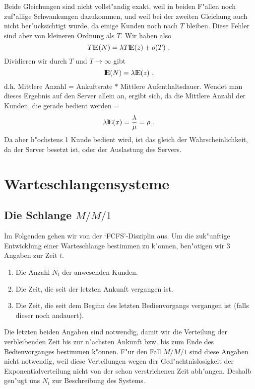 Beide Gleichungen sind nicht vollst"andig exakt, weil in beiden F"allen
noch zuf"allige Schwankungen dazukommen, und weil bei der zweiten
Gleichung auch nicht ber"ucksichtigt wurde, da\3 einige Kunden noch nach
$T$ bleiben. Diese Fehler sind aber von kleineren Ordnung als $T$. Wir
haben also
\begin{displaymath}
T {\rm I\kern-0.2em E} (N) = \lambda T {\rm I\kern-0.2em E} (z) + o(T) ~.
\end{displaymath}
Dividieren wir durch $T$ und $T \rightarrow \infty$ gibt
\begin{displaymath}
{\rm I\kern-0.2em E} (N) = \lambda  {\rm I\kern-0.2em E} (z) ~,
\end{displaymath}
d.h. Mittlere Anzahl = Ankuftsrate $*$ Mittlere Aufenthaltsdauer. Wendet
man dieses Ergebnis auf den Server allein an, ergibt sich, da\3 die
Mittlere Anzahl der Kunden, die gerade bedient werden =
\begin{displaymath}
\lambda  {\rm I\kern-0.2em E} (x) = \frac{\lambda}{\mu} = \rho ~.
\end{displaymath}
Da aber h"ochstens 1 Kunde bedient wird, ist das gleich der
Wahrscheinlichkeit, da\3 der Server besetzt ist, oder der Auslastung des
Servers.
\chapter{Warteschlangensysteme}
\section{Die Schlange $M/M/1$}
Im Folgenden gehen wir von der `FCFS'-Disziplin aus.
Um die zuk"unftige Entwicklung einer Warteschlange bestimmen zu k"onnen,
ben"otigen wir 3 Angaben zur Zeit $t$.
\begin{enumerate}
\item Die Anzahl $N_{t}$ der anwesenden Kunden.
\item Die Zeit, die seit der letzten Ankunft vergangen ist.
\item Die Zeit, die seit dem Beginn des letzten Bedienvorgangs vergangen
ist (falls dieser noch andauert).
\end{enumerate}
Die letzten beiden Angaben sind notwendig, damit wir die Verteilung der
verbleibenden Zeit bis zur n"achsten Ankunft bzw. bis zum Ende des
Bedienvorganges bestimmen k"onnen. F"ur den Fall $M/M/1$ sind diese
Angaben nicht notwendig, weil diese Verteilungen wegen der
Ged"achtnislosigkeit der Exponentialverteilung nicht von der schon
verstrichenen Zeit abh"angen. Deshalb gen"ugt uns $N_{t}$ zur Beschreibung
des Systems.

